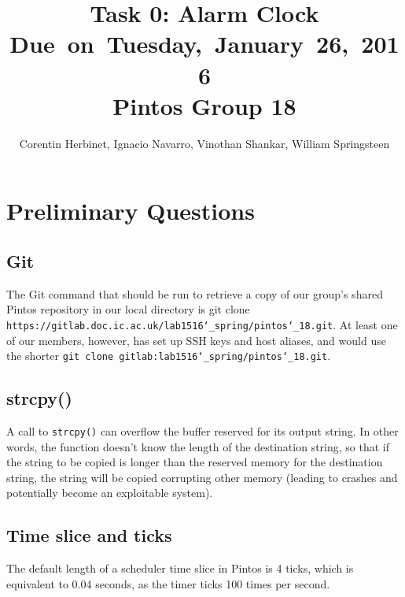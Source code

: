 \documentclass{article}
\title{
\vspace{2in}
\textmd{\textbf{Task 0: Alarm Clock}}\\
\normalsize\vspace{0.1in}\small{Due\ on\ Tuesday,\ January\ 26,\ 2016}\\
\vspace{0.1in}\large{\textbf{Pintos Group 18}}
\vspace{3in}
}
\author{Corentin Herbinet, Ignacio Navarro, Vinothan Shankar, William Springsteen}
\date{}
\renewcommand{\_}{\char`_}
\begin{document}
\maketitle

\newpage


\section{Preliminary Questions}
\subsection{Git}
The Git command that should be run to retrieve a copy of our group's shared 
Pintos repository in our local directory is git clone \texttt{https://gitlab.doc.ic.ac.uk/lab1516\_spring/pintos\_18.git}.
At least one of our members, however, has set up SSH keys and host aliases,
and would use the shorter \texttt{git clone gitlab:lab1516\_spring/pintos\_18.git}.

\subsection{strcpy()}
A call to \texttt{strcpy()} can overflow the buffer reserved for its output string. 
In other words, the function doesn't know the length of the destination string,
so that if the string to be copied is longer than the reserved memory for 
the destination string, the string will be copied corrupting other memory 
(leading to crashes and potentially become an exploitable system).


\subsection{Time slice and ticks}
The default length of a scheduler time slice in Pintos is 4 ticks, 
which is equivalent to 0.04 seconds, as the timer ticks 100 times per second.
\end{document}
